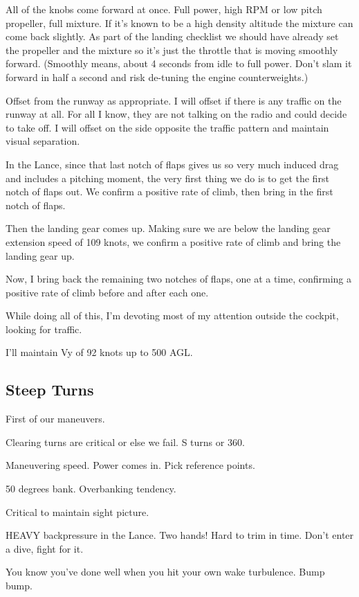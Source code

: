 All of the knobs come forward at once. Full power, high RPM or low pitch propeller, full mixture. If it's known to be a high density altitude the mixture can come back slightly. As part of the landing checklist we should have already set the propeller and the mixture so it's just the throttle that is moving smoothly forward. (Smoothly means, about 4 seconds from idle to full power. Don't slam it forward in half a second and risk de-tuning the engine counterweights.)

Offset from the runway as appropriate. I will offset if there is any traffic on the runway at all. For all I know, they are not talking on the radio and could decide to take off. I will offset on the side opposite the traffic pattern and maintain visual separation.

In the Lance, since that last notch of flaps gives us so very much induced drag and includes a pitching moment, the very first thing we do is to get the first notch of flaps out. We confirm a positive rate of climb, then bring in the first notch of flaps.

Then the landing gear comes up. Making sure we are below the landing gear extension speed of 109 knots, we confirm a positive rate of climb and bring the landing gear up.

Now, I bring back the remaining two notches of flaps, one at a time, confirming a positive rate of climb before and after each one.

While doing all of this, I'm devoting most of my attention outside the cockpit, looking for traffic.

I'll maintain Vy of 92 knots up to 500 AGL.

\subsection{Steep Turns}

First of our maneuvers.

Clearing turns are critical or else we fail. S turns or 360.

Maneuvering speed. Power comes in. Pick reference points.

50 degrees bank. Overbanking tendency.

Critical to maintain sight picture.

HEAVY backpressure in the Lance. Two hands! Hard to trim in time. Don't enter a dive, fight for it.

You know you've done well when you hit your own wake turbulence. Bump bump.

